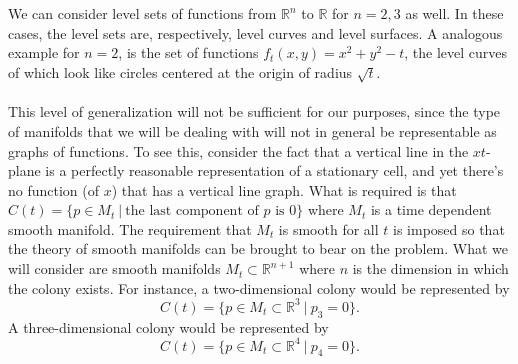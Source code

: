 \\
\\
We can consider level sets of functions from $\mathbb{R}^n$ to $\mathbb{R}$ for $n = 2,3$ as well. In these cases, the level sets are, respectively, level curves and level surfaces. A analogous example for $n=2$, is the set of functions $f_t(x,y) = x^2+y^2-t$, the level curves of which look like circles centered at the origin of radius $\sqrt{t}$.
\\
\\
This level of generalization will not be sufficient for our purposes, since the type of manifolds that we will be dealing with will not in general be representable as graphs of functions. To see this, consider the fact that a vertical line in the $xt$-plane is a perfectly reasonable representation of a stationary cell, and yet there's no function (of $x$) that has a vertical line graph. What is required is that $C(t) = \{ p \in M_t \ | \ \textrm{the last component of $p$ is $0$} \}$ where $M_t$ is a time dependent smooth manifold. The requirement that $M_t$ is smooth for all $t$ is imposed so that the theory of smooth manifolds can be brought to bear on the problem. What we will consider are smooth manifolds $M_t \subset \mathbb{R}^{n+1}$ where $n$ is the dimension in which the colony exists. For instance, a two-dimensional colony would be represented by
\begin{equation}
        C(t) = \{ p \in M_t \subset \mathbb{R}^3 \ | \ p_3 = 0  \}.
\end{equation}
A three-dimensional colony would be represented by
\begin{equation}
        C(t) = \{ p \in M_t \subset \mathbb{R}^4 \ | \ p_4 = 0  \}.
\end{equation}


